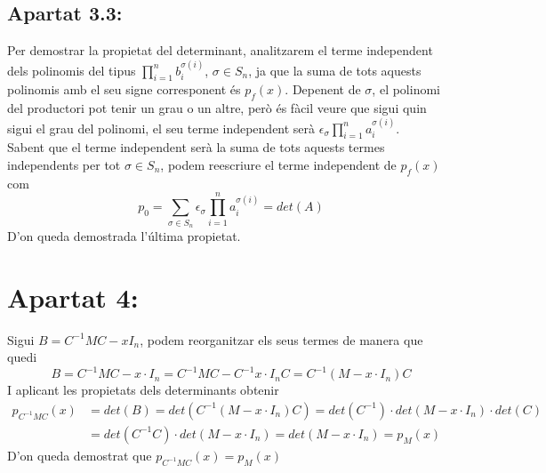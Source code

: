 \documentclass[a4paper, 11pt]{article}
\begin{document}
    \subsection*{Apartat 3.3:}
    Per demostrar la propietat del determinant, analitzarem el terme independent dels polinomis del tipus $\prod_{i = 1}^n b_i^{\sigma (i)}$, $\sigma \in S_n$, ja que la suma de tots aquests polinomis amb el seu signe corresponent \'es $p_f(x)$. Depenent de $\sigma$, el polinomi del productori pot tenir un grau o un altre, per\`o \'es f\`acil veure que sigui quin sigui el grau del polinomi, el seu terme independent ser\`a $\epsilon_\sigma\prod_{i = 1}^n a_i^{\sigma(i)}$.\\
    Sabent que el terme independent ser\`a la suma de tots aquests termes independents per tot $\sigma \in S_n$, podem reescriure el terme independent de $p_f(x)$ com
    $$
        p_0 = \sum_{\sigma \in S_n}\epsilon_\sigma\prod_{i=1}^n a_i^{\sigma(i)} = det(A)
    $$
    D'on queda demostrada l'\'ultima propietat.
    \section*{Apartat 4:}
    Sigui $B = C^{-1}MC - x I_n$, podem reorganitzar els seus termes de manera que quedi
    $$
        B = C^{-1}MC - x\cdot I_n = C^{-1}MC - C^{-1}x\cdot I_n C = C^{-1}(M - x\cdot I_n)C
    $$
    I aplicant les propietats dels determinants obtenir
    \begin{align*}
        p_{C^{-1}MC}(x) &= det(B) = det(C^{-1}(M - x\cdot I_n)C) = det(C^{-1})\cdot det(M - x\cdot I_n)\cdot det(C) \\
        &= det(C^{-1}C)\cdot det(M - x\cdot I_n) = det(M - x\cdot I_n) = p_M(x)
    \end{align*}
    D'on queda demostrat que $p_{C^{-1}MC}(x) = p_M(x)$
\end{document}
